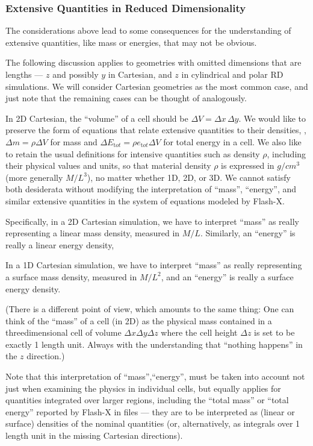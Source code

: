 \subsubsection{Extensive Quantities in Reduced Dimensionality}\label{Sec:ExtQinRD}
The considerations above lead to some consequences for the understanding
of extensive quantities, like mass or energies, that may not be obvious.

The following discussion applies to geometries with
omitted dimensions that are lengths --- $z$ and possibly $y$ in Cartesian,
and $z$ in cylindrical and polar RD simulations.
We will consider Cartesian geometries as the most common case,
and just note that the remaining cases can be thought of analogously.

In 2D Cartesian, the ``volume'' of a cell should be $\Delta V = \Delta x\,\Delta y$.
We would like to preserve the form of equations that relate extensive quantities
to their densities, \eg,
$\Delta m = \rho \Delta V$ for mass and 
$\Delta E_{\mathrm tot} = \rho e_{\mathrm tot}\Delta V$ for total energy
in a cell. We also like to retain the usual definitions for
intensive quantities such as density $\rho$, including 
their physical values and units, so that material density $\rho$
is expressed in $g/cm^3$ (more generally $M/L^3$),
no matter whether 1D, 2D, or 3D.
We cannot satisfy both desiderata without modifying the interpretation
of ``mass'', ``energy'', and similar extensive quantities in the
system of equations modeled by Flash-X.

Specifically, in a 2D Cartesian simulation, we have to interpret ``mass''
as really representing a linear mass density, measured in $M/L$.
Similarly, an ``energy'' is really a linear energy density, \etc

In a 1D Cartesian simulation, we have to interpret ``mass''
as really representing a surface mass density, measured in $M/L^2$,
and an ``energy'' is really a surface energy density.

(There is a different point of view, which amounts to the same thing:
One can think of the ``mass'' of a cell (in 2D) as the physical mass contained in a
threedimensional cell of volume $\Delta x \Delta y \Delta z$ where the
cell height $\Delta z$
is set to be exactly 1 length unit. Always with the understanding that
``nothing happens'' in the $z$ direction.)

Note that this interpretation of ``mass'',``energy'', \etc
must be taken into account not just when examining the physics in individual cells,
but equally applies for quantities integrated over larger regions, including
the ``total mass'' or ``total energy'' \etc reported by Flash-X in 
files --- they are to be interpreted as (linear or surface) densities
of the nominal quantities (or, alternatively, as integrals over 1 length unit
in the missing Cartesian directions).


